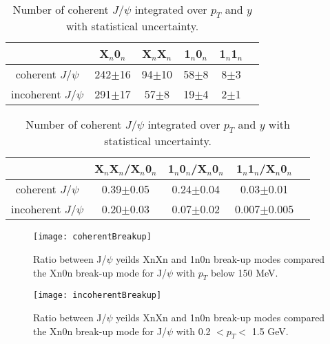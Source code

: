     \begin{table}[h]
    \begin{center}
    \caption{Number of coherent $J/\psi$ integrated over $p_{T}$ and $y$ with statistical uncertainty.}
    \label{tab:r1}
    \begin{tabular}{|c|c|c|c|c|c|}
    \hline
                                   &  X$_{n}$0$_{n}$& X$_{n}$X$_{n}$ & 1$_{n}$0$_{n}$ & 1$_{n}$1$_{n}$  \\ 
    \hline
    coherent $J/\psi$ &  242$\pm$16&94$\pm$10&58$\pm$8&8$\pm$3\\
    \hline
     incoherent $J/\psi$ & 291$\pm$17&57$\pm$8&19$\pm$4&2$\pm$1  \\
    \hline
    \end{tabular}
    \end{center}
    
    \end{table}
    
    
    \begin{table}[h]
    \begin{center}
    
    \caption{Number of coherent $J/\psi$ integrated over $p_{T}$ and $y$ with statistical uncertainty.}
    \label{tab:r2}
    \begin{tabular}{|c|c|c|c|c|}
    \hline
                                     & X$_{n}$X$_{n}$/X$_{n}$0$_{n}$ & 1$_{n}$0$_{n}$/X$_{n}$0$_{n}$ & 1$_{n}$1$_{n}$/X$_{n}$0$_{n}$  \\ 
    \hline
    coherent $J/\psi$ &  0.39$\pm$0.05&0.24$\pm$0.04&0.03$\pm$0.01\\
    \hline
     incoherent $J/\psi$ &  0.20$\pm$0.03&0.07$\pm$0.02&0.007$\pm$0.005 \\
    \hline
    \end{tabular}
    \end{center}
    
    \end{table}
       \begin{figure}[!Hhtb]
        \centering
        \texttt{[image: coherentBreakup]}
        \caption{Ratio between J/$\psi$ yeilds XnXn and 1n0n break-up modes 
          compared the Xn0n break-up mode for J/$\psi$ with $p_{T}$ below 150 
          MeV.}
        \label{fig:coherentBreakUp}
      \end{figure}

       \begin{figure}[!Hhtb]
        \centering
        \texttt{[image: incoherentBreakup]}
        \caption{Ratio between J/$\psi$ yeilds XnXn and 1n0n break-up modes 
          compared the Xn0n break-up mode for J/$\psi$ with 0.2 $< p_{T} <$ 
          1.5 GeV.}
        \label{fig:incoherentBreakUp}
      \end{figure}

